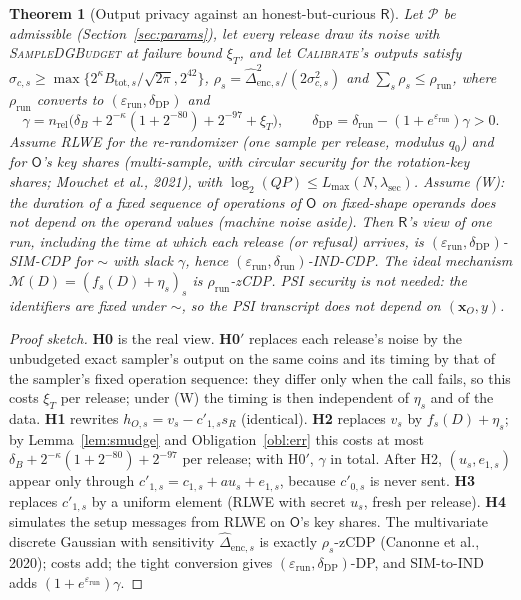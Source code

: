 \documentclass[11pt]{article}
\theoremstyle{definition}
\theoremstyle{plain}
\newtheorem{theorem}{Theorem}
\newcommand{\Rp}{\mathsf{R}}
\newcommand{\Op}{\mathsf{O}}
\newcommand{\bx}{\mathbf{x}}
\begin{document}
\begin{theorem}[Output privacy against an honest-but-curious $\Rp$]\label{thm:output}
Let $\mathcal P$ be admissible (Section~\ref{sec:params}), let every release draw its noise with \textup{\textsc{SampleDGBudget}} at failure bound $\xi_T$, and let \textup{\textsc{Calibrate}}'s outputs satisfy $\sigma_{c,s}\ge\max\{2^{\kappa}B_{\mathrm{tot},s}/\sqrt{2\pi},2^{42}\}$, $\rho_s=\widehat\Delta_{\mathrm{enc},s}^2/(2\sigma_{c,s}^2)$ and $\sum_s\rho_s\le\rho_{\mathrm{run}}$, where $\rho_{\mathrm{run}}$ converts to $(\varepsilon_{\mathrm{run}},\delta_{\mathrm{DP}})$ and
\[
  \gamma=n_{\mathrm{rel}}\bigl(\delta_B+2^{-\kappa}(1+2^{-80})+2^{-97}+\xi_T\bigr),\qquad \delta_{\mathrm{DP}}=\delta_{\mathrm{run}}-(1+e^{\varepsilon_{\mathrm{run}}})\gamma>0 .
\]
Assume RLWE for the re-randomizer (one sample per release, modulus $q_0$) and for $\Op$'s key shares (multi-sample, with circular security for the rotation-key shares; Mouchet et al., 2021), with $\log_2(QP)\le L_{\max}(N,\lambda_{\mathrm{sec}})$. Assume (W): the duration of a fixed sequence of operations of $\Op$ on fixed-shape operands does not depend on the operand values (machine noise aside). Then $\Rp$'s view of one run, including the time at which each release (or refusal) arrives, is $(\varepsilon_{\mathrm{run}},\delta_{\mathrm{DP}})$-SIM-CDP for $\sim$ with slack $\gamma$, hence $(\varepsilon_{\mathrm{run}},\delta_{\mathrm{run}})$-IND-CDP. The ideal mechanism $\mathcal M(D)=(f_s(D)+\eta_s)_s$ is $\rho_{\mathrm{run}}$-zCDP. PSI security is not needed: the identifiers are fixed under $\sim$, so the PSI transcript does not depend on $(\bx_O,y)$.
\end{theorem}

\begin{proof}[Proof sketch]
\textbf{H0} is the real view. \textbf{H0}$'$ replaces each release's noise by the unbudgeted exact sampler's output on the same coins and its timing by that of the sampler's fixed operation sequence: they differ only when the call fails, so this costs $\xi_T$ per release; under (W) the timing is then independent of $\eta_s$ and of the data. \textbf{H1} rewrites $h_{O,s}=v_s-c'_{1,s}s_R$ (identical). \textbf{H2} replaces $v_s$ by $f_s(D)+\eta_s$; by Lemma~\ref{lem:smudge} and Obligation~\ref{obl:err} this costs at most $\delta_B+2^{-\kappa}(1+2^{-80})+2^{-97}$ per release; with H0$'$, $\gamma$ in total. After H2, $(u_s,e_{1,s})$ appear only through $c'_{1,s}=c_{1,s}+au_s+e_{1,s}$, because $c'_{0,s}$ is never sent. \textbf{H3} replaces $c'_{1,s}$ by a uniform element (RLWE with secret $u_s$, fresh per release). \textbf{H4} simulates the setup messages from RLWE on $\Op$'s key shares. The multivariate discrete Gaussian with sensitivity $\widehat\Delta_{\mathrm{enc},s}$ is exactly $\rho_s$-zCDP (Canonne et al., 2020); costs add; the tight conversion gives $(\varepsilon_{\mathrm{run}},\delta_{\mathrm{DP}})$-DP, and SIM-to-IND adds $(1+e^{\varepsilon_{\mathrm{run}}})\gamma$.
\end{proof}
\end{document}
